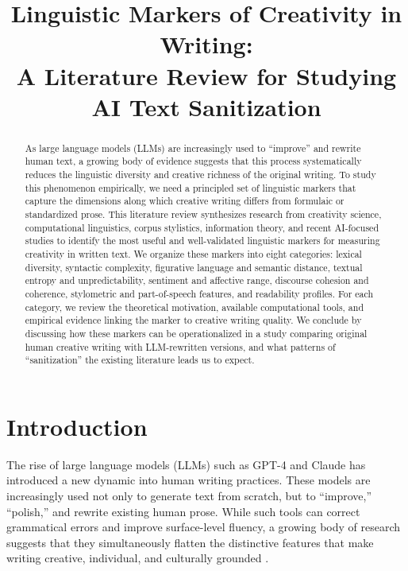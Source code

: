 \documentclass[12pt,a4paper]{article}
\title{Linguistic Markers of Creativity in Writing:\\A Literature Review for Studying AI Text Sanitization}
\author{}
\date{}
\begin{document}
\maketitle

\begin{abstract}
As large language models (LLMs) are increasingly used to ``improve'' and rewrite human text, a growing body of evidence suggests that this process systematically reduces the linguistic diversity and creative richness of the original writing. To study this phenomenon empirically, we need a principled set of linguistic markers that capture the dimensions along which creative writing differs from formulaic or standardized prose. This literature review synthesizes research from creativity science, computational linguistics, corpus stylistics, information theory, and recent AI-focused studies to identify the most useful and well-validated linguistic markers for measuring creativity in written text. We organize these markers into eight categories: lexical diversity, syntactic complexity, figurative language and semantic distance, textual entropy and unpredictability, sentiment and affective range, discourse cohesion and coherence, stylometric and part-of-speech features, and readability profiles. For each category, we review the theoretical motivation, available computational tools, and empirical evidence linking the marker to creative writing quality. We conclude by discussing how these markers can be operationalized in a study comparing original human creative writing with LLM-rewritten versions, and what patterns of ``sanitization'' the existing literature leads us to expect.
\end{abstract}

\section{Introduction}

The rise of large language models (LLMs) such as GPT-4 and Claude has introduced a new dynamic into human writing practices. These models are increasingly used not only to generate text from scratch, but to ``improve,'' ``polish,'' and rewrite existing human prose. While such tools can correct grammatical errors and improve surface-level fluency, a growing body of research suggests that they simultaneously flatten the distinctive features that make writing creative, individual, and culturally grounded \citep{anderson2024homogenizing, kreminski2024homogenization, homogenization_arxiv2025}.
\end{document}
